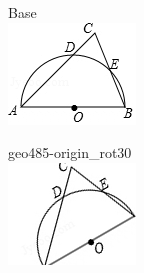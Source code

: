 \documentclass[12pt]{article}
\begin{document}
\begin{center}
\begin{minipage}{0.32\textwidth}\centering
Base\\
\includegraphics[width=0.95\linewidth]{out_rommath_origin/items/geo485-origin/assets/figure.png}
\end{minipage}
\hfill\begin{minipage}{0.32\textwidth}\centering
geo485-origin\_rot30\\
\includegraphics[width=0.95\linewidth]{out_rommath_origin/items/geo485-origin/assets/figure_rot30.png}
\end{minipage}
\hfill\begin{minipage}{0.32\textwidth}\centering

\end{minipage}
\end{center}
\end{document}
